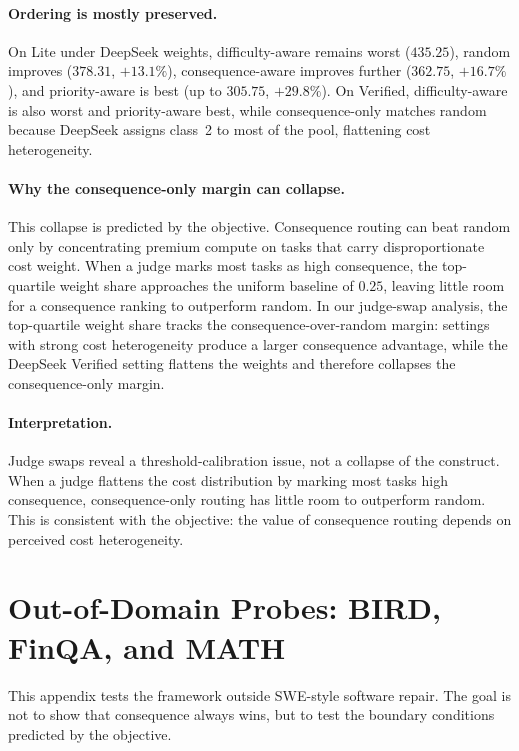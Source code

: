 \documentclass{article}
\begin{document}
\paragraph{Ordering is mostly preserved.}
On Lite under DeepSeek weights, difficulty-aware remains worst
($435.25$), random improves ($378.31$, $+13.1\%$), consequence-aware
improves further ($362.75$, $+16.7\%$), and priority-aware is best
(up to $305.75$, $+29.8\%$). On Verified, difficulty-aware is also
worst and priority-aware best, while consequence-only matches random
because DeepSeek assigns class~2 to most of the pool, flattening cost
heterogeneity.

\paragraph{Why the consequence-only margin can collapse.}
This collapse is predicted by the objective. Consequence routing can
beat random only by concentrating premium compute on tasks that carry
disproportionate cost weight. When a judge marks most tasks as high
consequence, the top-quartile weight share approaches the uniform
baseline of $0.25$, leaving little room for a consequence ranking to
outperform random. In our judge-swap analysis, the top-quartile weight
share tracks the consequence-over-random margin: settings with strong
cost heterogeneity produce a larger consequence advantage, while the
DeepSeek Verified setting flattens the weights and therefore collapses
the consequence-only margin.

\paragraph{Interpretation.}
Judge swaps reveal a threshold-calibration issue, not a collapse of
the construct. When a judge flattens the cost distribution by marking
most tasks high consequence, consequence-only routing has little room
to outperform random. This is consistent with the objective: the value
of consequence routing depends on perceived cost heterogeneity.

\section{Out-of-Domain Probes: BIRD, FinQA, and MATH}
\label{app:ood}

This appendix tests the framework outside SWE-style software repair.
The goal is not to show that consequence always wins, but to test the
boundary conditions predicted by the objective.
\end{document}
